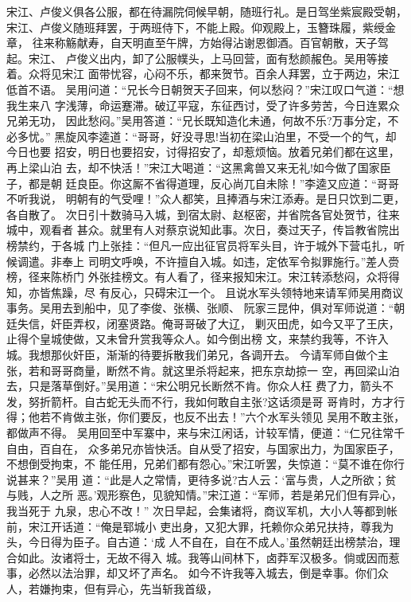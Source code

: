 宋江、卢俊义俱各公服，都在待漏院伺候早朝，随班行礼。是日驾坐紫宸殿受朝，
宋江、卢俊义随班拜罢，于两班侍下，不能上殿。仰观殿上，玉簪珠履，紫绶金章，
往来称觞献寿，自天明直至午牌，方始得沾谢恩御酒。百官朝散，天子驾起。宋江、
卢俊义出内，卸了公服幞头，上马回营，面有愁颜赧色。吴用等接着。众将见宋江
面带忧容，心闷不乐，都来贺节。百余人拜罢，立于两边，宋江低首不语。
吴用问道：“兄长今日朝贺天子回来，何以愁闷？”宋江叹口气道：“想我生来八
字浅薄，命运蹇滞。破辽平寇，东征西讨，受了许多劳苦，今日连累众兄弟无功，
因此愁闷。”吴用答道：“兄长既知造化未通，何故不乐?万事分定，不必多忧。”
黑旋风李逵道：“哥哥，好没寻思!当初在梁山泊里，不受一个的气，却今日也要
招安，明日也要招安，讨得招安了，却惹烦恼。放着兄弟们都在这里，再上梁山泊
去，却不快活！”宋江大喝道：“这黑禽兽又来无礼!如今做了国家臣子，都是朝
廷良臣。你这厮不省得道理，反心尚兀自未除！”李逵又应道：“哥哥不听我说，
明朝有的气受哩！”众人都笑，且捧酒与宋江添寿。是日只饮到二更，各自散了。
次日引十数骑马入城，到宿太尉、赵枢密，并省院各官处贺节，往来城中，观看者
甚众。就里有人对蔡京说知此事。次日，奏过天子，传旨教省院出榜禁约，于各城
门上张挂：“但凡一应出征官员将军头目，许于城外下营屯扎，听候调遣。非奉上
司明文呼唤，不许擅自入城。如违，定依军令拟罪施行。”差人赍榜，径来陈桥门
外张挂榜文。有人看了，径来报知宋江。宋江转添愁闷，众将得知，亦皆焦躁，尽
有反心，只碍宋江一个。
且说水军头领特地来请军师吴用商议事务。吴用去到船中，见了李俊、张横、张顺、
阮家三昆仲，俱对军师说道：“朝廷失信，奸臣弄权，闭塞贤路。俺哥哥破了大辽，
剿灭田虎，如今又平了王庆，止得个皇城使做，又未曾升赏我等众人。如今倒出榜
文，来禁约我等，不许入城。我想那伙奸臣，渐渐的待要拆散我们弟兄，各调开去。
今请军师自做个主张，若和哥哥商量，断然不肯。就这里杀将起来，把东京劫掠一
空，再回梁山泊去，只是落草倒好。”吴用道：“宋公明兄长断然不肯。你众人枉
费了力，箭头不发，努折箭杆。自古蛇无头而不行，我如何敢自主张?这话须是哥
哥肯时，方才行得；他若不肯做主张，你们要反，也反不出去！”六个水军头领见
吴用不敢主张，都做声不得。
吴用回至中军寨中，来与宋江闲话，计较军情，便道：“仁兄往常千自由，百自在，
众多弟兄亦皆快活。自从受了招安，与国家出力，为国家臣子，不想倒受拘束，不
能任用，兄弟们都有怨心。”宋江听罢，失惊道：“莫不谁在你行说甚来？”吴用
道：“此是人之常情，更待多说?古人云：‘富与贵，人之所欲；贫与贱，人之所
恶。’观形察色，见貌知情。”宋江道：“军师，若是弟兄们但有异心，我当死于
九泉，忠心不改！”
次日早起，会集诸将，商议军机，大小人等都到帐前，宋江开话道：“俺是郓城小
吏出身，又犯大罪，托赖你众弟兄扶持，尊我为头，今日得为臣子。自古道：‘成
人不自在，自在不成人。’虽然朝廷出榜禁治，理合如此。汝诸将士，无故不得入
城。我等山间林下，卤莽军汉极多。倘或因而惹事，必然以法治罪，却又坏了声名。
如今不许我等入城去，倒是幸事。你们众人，若嫌拘束，但有异心，先当斩我首级，
